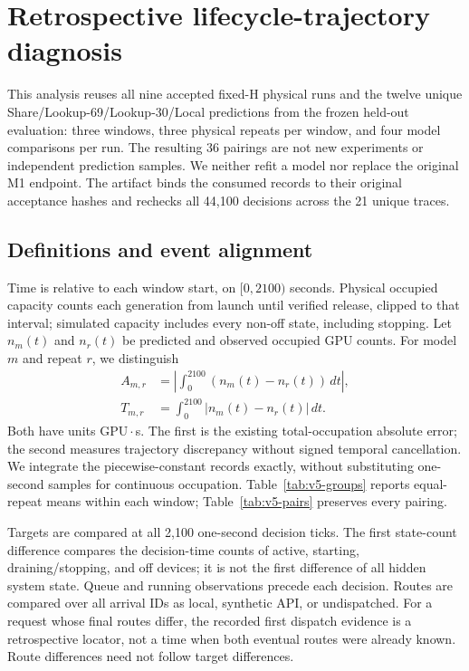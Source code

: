 \section{Retrospective lifecycle-trajectory diagnosis}
\label{sec:v5-trajectories}
This analysis reuses all nine accepted fixed-H physical runs and the twelve
unique Share/Lookup-69/Lookup-30/Local predictions from the frozen held-out evaluation: three windows,
three physical repeats per window, and four model comparisons per run.
The resulting 36 pairings are not new experiments or independent prediction
samples. We neither refit a model nor replace the original M1 endpoint.
The artifact binds the consumed records to their original acceptance hashes
and rechecks all 44,100 decisions across the 21 unique traces.

\subsection{Definitions and event alignment}
Time is relative to each window start, on $[0,2100)$ seconds.
Physical occupied capacity counts each generation from launch until verified
release, clipped to that interval; simulated capacity includes every non-off
state, including stopping. Let $n_m(t)$ and $n_r(t)$ be predicted and observed
occupied GPU counts. For model $m$ and repeat $r$, we distinguish
\begin{align}
A_{m,r} &= \left|\int_0^{2100}(n_m(t)-n_r(t))\,dt\right|,\\
T_{m,r} &= \int_0^{2100}|n_m(t)-n_r(t)|\,dt.
\end{align}
Both have units GPU\,$\cdot$\,s. The first is the existing total-occupation
absolute error; the second measures trajectory discrepancy without signed
temporal cancellation. We integrate the piecewise-constant records exactly,
without substituting one-second samples for continuous occupation.
Table~\ref{tab:v5-groups} reports equal-repeat means within each window;
Table~\ref{tab:v5-pairs} preserves every pairing.

Targets are compared at all 2,100 one-second decision ticks. The first
state-count difference compares the decision-time counts of active, starting,
draining/stopping, and off devices; it is not the first difference of all
hidden system state. Queue and running observations precede each decision.
Routes are compared over all arrival IDs as local, synthetic API, or
undispatched. For a request whose final routes differ, the recorded first
dispatch evidence is a retrospective locator, not a time when both eventual
routes were already known. Route differences need not follow target differences.

